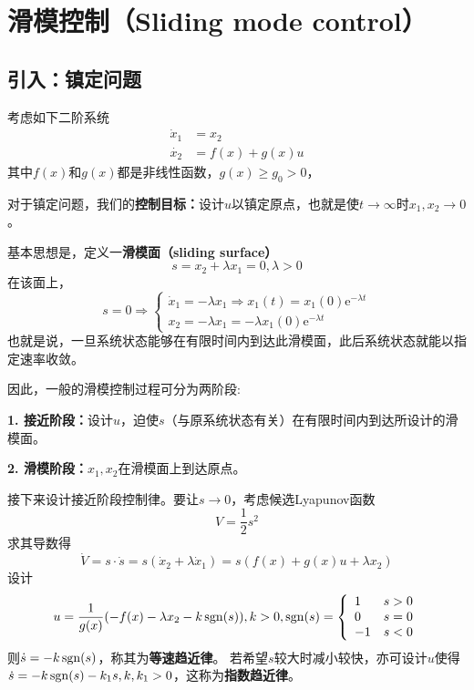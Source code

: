 \newpage
\section{滑模控制（Sliding mode control）}\label{5Cref}

\subsection{引入：镇定问题}

 考虑如下二阶系统
 \begin{equation}
   \begin{aligned}
    \dot{x}_1 & = x_2\\
       \dot{x_2} & = f (x) + g (x) u
    \end{aligned}\label{Sys:sliding_mode}
 \end{equation}
  其中$f (x)$和$g (x)$都是非线性函数，$g (x) \geq g_0 > 0$，
  
  对于镇定问题，我们的\textbf{控制目标：}设计$u$以镇定原点，也就是使$t
  \rightarrow \infty $时$ x_1, x_2 \rightarrow 0$。
  
  基本思想是，定义一\textbf{滑模面（sliding surface）}\[s = x_2 + \lambda x_1 = 0,
  \lambda > 0\]
  在该面上， \[ s = 0 \Rightarrow \left\{\begin{array}{l}
       \dot{x}_1 = - \lambda x_1 \Rightarrow x_1 (t) = x_1 (0) \mathrm{e}^{- \lambda t}\\
       x_2 = - \lambda x_1 = - \lambda x_1 (0) \mathrm{e}^{- \lambda  t}
     \end{array}\right. \]
     也就是说，一旦系统状态能够在有限时间内到达此滑模面，此后系统状态就能以指定速率收敛。
  
  因此，一般的滑模控制过程可分为两阶段:
  
  \textbf{1. 接近阶段：}设计$u$，迫使$s$（与原系统状态有关）在有限时间内到达所设计的滑模面。
  
  \textbf{2. 滑模阶段：}$x_1, x_2$在滑模面上到达原点。
  
  接下来设计接近阶段控制律。要让$s\to 0$，考虑候选Lyapunov函数\[V = \frac{1}{2} s^2\]
  求其导数得
  \[ \dot{V} = s \cdot \dot{s}=s(\dot{x}_2 + \lambda \dot{x}_1) = s (f (x) + g (x) u + \lambda x_2) \]
  设计\[u = \frac{1}{g (x)} (- f (x) - \lambda x_2 - k \operatorname{sgn} (s)),k > 0,\operatorname{sgn}(s) = \left\{\begin{array}{ll}
  1 & s > 0\\
  0 & s = 0\\
  - 1 & s < 0
\end{array}\right.\]
  则$\dot{s} = - k \operatorname{sgn} (s)$，称其为\textbf{等速趋近律}。
  若希望$s$较大时减小较快，亦可设计$u$使得$\dot{s}
  = - k \operatorname{sgn} (s) - k_1 s,k,k_1>0$，这称为\textbf{指数趋近律}。
  
